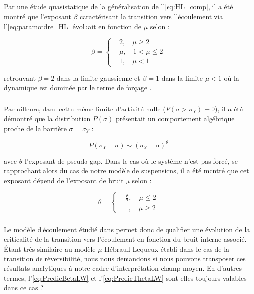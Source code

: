 \subparagraph{}Par une étude quasistatique de la généralisation de l'\autoref{eq:HL_comp}, il a été montré que l'exposant $\beta$ caractérisant la transition vers l'écoulement via l'\autoref{eq:paramordre_HL} évoluait en fonction de $\mu$ selon :

\begin{equation}
	\beta = \left\{
	\begin{aligned}
	&2, \quad \mu \geq 2\\
	&\mu, \quad 1<\mu\leq2\\
	&1, \quad \mu < 1
	\end{aligned}
	\right.
	\label{eq:PredicBetaLW}
\end{equation}

\noindent retrouvant $\beta = 2$ dans la limite gaussienne et $\beta = 1$ dans la limite $\mu<1$ où la dynamique est dominée par le terme de forçage \cite{lin_mean-field_2016}.

\subparagraph{}Par ailleurs, dans cette même limite d'activité nulle ($P(\sigma>\sigma_Y)=0$), il a été démontré que la distribution $P(\sigma)$ présentait un comportement algébrique proche de la barrière $\sigma = \sigma_Y$ \cite{lin_mean-field_2016} :

\begin{equation}
	P(\sigma_Y-\sigma) \sim (\sigma_Y-\sigma)^\theta
\end{equation}

\noindent avec $\theta$ l'exposant de pseudo-gap. Dans le cas où le système n'est pas forcé, se rapprochant alors du cas de notre modèle de suspensions, il a été montré que cet exposant dépend de l'exposant de bruit $\mu$ selon :

\begin{equation}
	\theta = \left\{
	\begin{aligned}
	&\frac{\mu}{2}, \quad \mu \leq 2\\
	&1, \quad \mu \geq 2
	\end{aligned}
	\right.
	\label{eq:PredicThetaLW}
\end{equation}

\subparagraph{}Le modèle d'écoulement étudié dans \cite{lin_mean-field_2016, lin_microscopic_2018} permet donc de qualifier une évolution de la criticalité de la transition vers l'écoulement en fonction du bruit interne associé. \'Etant très similaire au modèle $\mu$-Hébraud-Lequeux établi dans le cas de la transition de réversibilité, nous nous demandons si nous pouvons transposer ces résultats analytiques à notre cadre d'interprétation champ moyen. En d'autres termes, l'\autoref{eq:PredicBetaLW} et l'\autoref{eq:PredicThetaLW} sont-elles toujours valables dans ce cas ?

